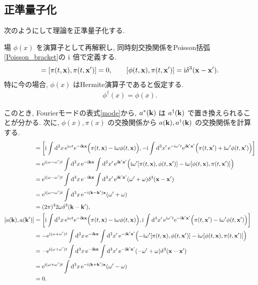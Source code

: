 \documentclass[../note01.tex]{subfiles}
\begin{document}
\subsection{正準量子化}
次のようにして理論を正準量子化する.
\begin{katei}
    場 $ \phi(x) $ を演算子として再解釈し, 同時刻交換関係をPoisson括弧\eqref{Poisson_bracket}の $\mathrm{i}$ 倍で定義する.
    \begin{align}
        [\phi(t,\vb{x}),\phi(t,\vb{x}')] = [\pi(t,\vb{x}),\pi(t,\vb{x}')] = 0, \qquad
        [\phi(t,\vb{x}),\pi(t,\vb{x}')]=\I\delta^3(\vb{x}-\vb{x}').
    \end{align}
    特に今の場合, $ \phi(x) $ はHermite演算子であると仮定する.
    \begin{align}
        \phi^\dagger(x) = \phi(x).
    \end{align}
\end{katei}
\noindent このとき, Fourierモードの表式\eqref{mode}から, $ a^*(\vb{k}) $ は $ a^\dagger(\vb{k}) $ で置き換えられることが分かる.
次に, $ \phi(x),\pi(x) $ の交換関係から $ a(\vb{k}),a^\dagger(\vb{k}) $ の交換関係を計算する.
\begin{align*}
    [a(\vb{k}),a^\dagger(\vb{k}')] &= \qty[\I\int\dd[3]{x} \E^{\I\omega t}\E^{-\I\vb{k}\vb{x}} \Bigl(\pi(t,\vb{x})-\I\omega\phi(t,\vb{x})\Bigr), -\I\int\dd[3]{x'} \E^{-\I\omega't}\E^{\I\vb{k}'\vb{x}'} \Bigl(\pi(t,\vb{x}')+\I\omega'\phi(t,\vb{x}')\Bigr)] \\
    &= \E^{\I(\omega-\omega')t} \int\dd[3]{x}\E^{-\I\vb{k}\vb{x}} \int\dd[3]{x'}\E^{\I\vb{k}'\vb{x}'} \Bigl(\I\omega'[\pi(t,\vb{x}),\phi(t,\vb{x}')] - \I\omega[\phi(t,\vb{x}),\pi(t,\vb{x}')]\Bigr) \\
    &= \E^{\I(\omega-\omega')t} \int\dd[3]{x}\E^{-\I\vb{k}\vb{x}} \int\dd[3]{x'}\E^{\I\vb{k}'\vb{x}'} (\omega'+\omega)\delta^3(\vb{x}-\vb{x}') \\
    &= \E^{\I(\omega-\omega')t} \int\dd[3]{x}\E^{-\I(\vb{k}-\vb{k}')\vb{x}} (\omega'+\omega) \\
    &= (2\pi)^3 2\omega \delta^3(\vb{k}-\vb{k}'), \\
    [a(\vb{k}),a(\vb{k}')] &= \qty[\I\int\dd[3]{x} \E^{\I\omega t}\E^{-\I\vb{k}\vb{x}} \Bigl(\pi(t,\vb{x})-\I\omega\phi(t,\vb{x})\Bigr), \I\int\dd[3]{x'} \E^{\I\omega't}\E^{-\I\vb{k}'\vb{x}'} \Bigl(\pi(t,\vb{x}')-\I\omega'\phi(t,\vb{x}')\Bigr)] \\
    &= -\E^{\I(\omega+\omega')t} \int\dd[3]{x}\E^{-\I\vb{k}\vb{x}} \int\dd[3]{x'}\E^{-\I\vb{k}'\vb{x}'} \Bigl(-\I\omega'[\pi(t,\vb{x}),\phi(t,\vb{x}')] - \I\omega[\phi(t,\vb{x}),\pi(t,\vb{x}')]\Bigr) \\
    &= -\E^{\I(\omega+\omega')t} \int\dd[3]{x}\E^{-\I\vb{k}\vb{x}} \int\dd[3]{x'}\E^{-\I\vb{k}'\vb{x}'} (-\omega'+\omega)\delta^3(\vb{x}-\vb{x}') \\
    &= \E^{\I(\omega+\omega')t} \int\dd[3]{x}\E^{-\I(\vb{k}+\vb{k}')\vb{x}} (\omega'-\omega) \\
    &= 0.
\end{align*}
\end{document}
